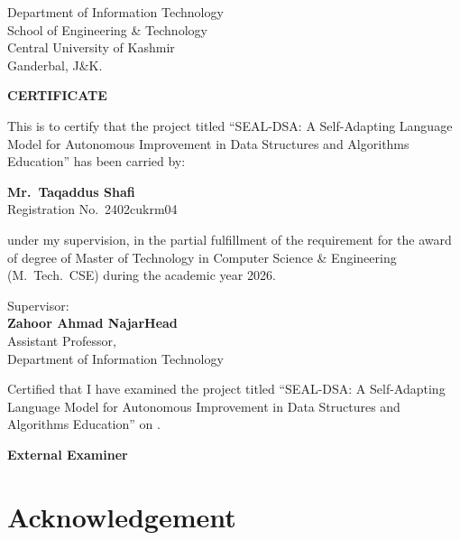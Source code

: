 \documentclass[12pt,a4paper]{report}
\begin{document}
\vspace{0.3cm}

\noindent Department of Information Technology\\
School of Engineering \& Technology\\
Central University of Kashmir\\
Ganderbal, J\&K.

\vspace{0.6cm}

\begin{center}
{\large\bfseries CERTIFICATE}
\end{center}

\vspace{0.4cm}

This is to certify that the project titled ``SEAL-DSA: A Self-Adapting Language Model for Autonomous Improvement in Data Structures and Algorithms Education'' has been carried by:

\begin{center}
\textbf{Mr.~Taqaddus Shafi}\\[0.2cm]
Registration No.~2402cukrm04
\end{center}

under my supervision, in the partial fulfillment of the requirement for the award of degree of Master of Technology in Computer Science \& Engineering (M.~Tech.~CSE) during the academic year 2026.

\vspace{1cm}

\noindent Supervisor:\\[0.4cm]
\textbf{Zahoor Ahmad Najar}\hfill\textbf{Head}\\
Assistant Professor,\\
Department of Information Technology

\vspace{1cm}

Certified that I have examined the project titled ``SEAL-DSA: A Self-Adapting Language Model for Autonomous Improvement in Data Structures and Algorithms Education'' on \underline{\hspace{3cm}} \underline{\hspace{3cm}}.

\vspace{1cm}

\hfill\textbf{External Examiner}
\endgroup

\clearpage

\chapter*{Acknowledgement}
\begingroup
\singlespacing
\end{document}
